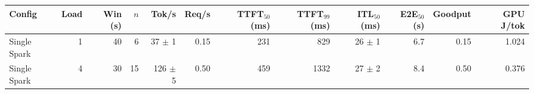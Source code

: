 \begin{tabular}{l r r r r r r r r r r r}
\toprule
Config & Load & Win (s) & $n$ & Tok/s & Req/s & TTFT$_{50}$ (ms) & TTFT$_{99}$ (ms) & ITL$_{50}$ (ms) & E2E$_{50}$ (s) & Goodput & GPU J/tok \\
\midrule
Single Spark & 1 & 40 & 6\rlap{$^\dagger$} & 37 $\pm$ 1 & 0.15 & 231 & 829 & 26 $\pm$ 1 & 6.7 & 0.15 & 1.024 \\
Single Spark & 4 & 30 & 15\rlap{$^\dagger$} & 126 $\pm$ 5 & 0.50 & 459 & 1332 & 27 $\pm$ 2 & 8.4 & 0.50 & 0.376 \\
\bottomrule
\end{tabular}
